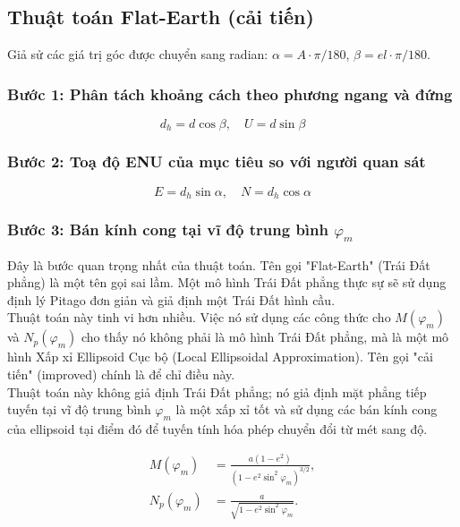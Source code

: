 \subsection{Thuật toán Flat-Earth (cải tiến)}
Giả sử các giá trị góc được chuyển sang radian: 
$\alpha = A \cdot \pi/180$, $\beta = el \cdot \pi/180$.

\subsubsection{Bước 1: Phân tách khoảng cách theo phương ngang và đứng}
\[
    d_h = d\cos\beta, \quad U = d\sin\beta
\] 

\subsubsection{Bước 2: Toạ độ ENU của mục tiêu so với người quan sát}
\[
    E = d_h \sin\alpha, \quad N = d_h \cos\alpha
\]

\subsubsection{Bước 3: Bán kính cong tại vĩ độ trung bình $\varphi_m$}

Đây là bước quan trọng nhất của thuật toán. Tên gọi "Flat-Earth" (Trái Đất phẳng) là một tên gọi sai lầm. Một mô hình Trái Đất phẳng thực sự sẽ sử dụng định lý Pitago đơn giản và giả định một Trái Đất hình cầu.\\

Thuật toán này tinh vi hơn nhiều. Việc nó sử dụng các công thức cho $M(\varphi_m)$ và $N_p(\varphi_m)$ cho thấy nó không phải là mô hình Trái Đất phẳng, mà là một mô hình Xấp xỉ Ellipsoid Cục bộ (Local Ellipsoidal Approximation). Tên gọi "cải tiến" (improved) chính là để chỉ điều này.\\

Thuật toán này không giả định Trái Đất phẳng; nó giả định mặt phẳng tiếp tuyến tại vĩ độ trung bình $\varphi_m$ là một xấp xỉ tốt và sử dụng các bán kính cong của ellipsoid tại điểm đó để tuyến tính hóa phép chuyển đổi từ mét sang độ.

\[
\begin{aligned}
    M(\varphi_m) &= \frac{a(1 - e^2)}{(1 - e^2 \sin^2 \varphi_m)^{3/2}}, \\
    N_p(\varphi_m) &= \frac{a}{\sqrt{1 - e^2 \sin^2 \varphi_m}}.
\end{aligned}
\]

